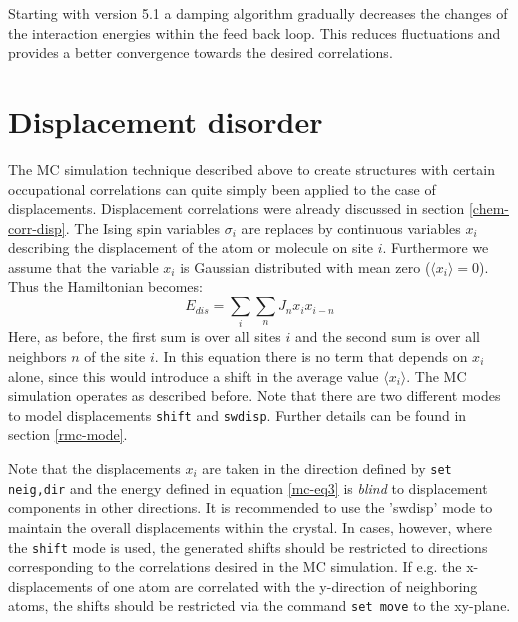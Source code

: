 Starting with \Discus version 5.1 a damping algorithm gradually
decreases the changes of the interaction energies within the feed
back loop. This reduces fluctuations and provides a better 
convergence towards the desired correlations.
\section{Displacement disorder \label{mc-corr-disp}}

The MC simulation technique described above to create structures
with certain occupational correlations can quite simply been applied
to the case of displacements. Displacement correlations were already
discussed in section \ref{chem-corr-disp}. The Ising spin variables
$\sigma_{i}$ are replaces by continuous variables $x_{i}$ describing
the displacement of the atom or molecule on site $i$. Furthermore we
assume that the variable $x_{i}$ is Gaussian distributed with mean
zero ($ \langle x_{i} \rangle = 0$). Thus the Hamiltonian becomes:
%
\begin{equation}
    E_{dis} = \sum_{i} \sum_{n} J_{n} x_{i} x_{i-n}
    \label{mc-eq3}
\end{equation}
%
Here, as before, the first sum is over all sites $i$ and the second
sum is over all neighbors $n$ of the site $i$. In this equation there is
no term that depends on $x_{i}$ alone, since this would introduce a
shift in the average value $\langle x_{i} \rangle$. The MC
simulation operates as described before. Note that there are two
different modes to model displacements {\tt shift} and {\tt swdisp}.
Further details can be found in section \ref{rmc-mode}.
\par

Note that the displacements $x_{i}$ are taken in the direction
defined by {\tt set neig,dir} and the energy defined in equation
\ref{mc-eq3} is {\it blind} to displacement components in other
directions. It is recommended to use the 'swdisp' mode to maintain
the overall displacements within the crystal. In cases, however,
where the {\tt shift} mode is used, the generated shifts should be
restricted to directions corresponding to the correlations desired
in the MC simulation. If e.g. the x-displacements of one atom are
correlated with the y-direction of neighboring atoms, the shifts
should be restricted via the command {\tt set move} to the xy-plane.


